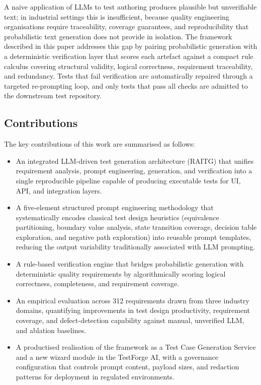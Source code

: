 \documentclass[11pt,letterpaper]{article}
\begin{document}
A naive application of LLMs to test authoring produces plausible but unverifiable text; in industrial settings this is insufficient, because quality engineering organisations require traceability, coverage guarantees, and reproducibility that probabilistic text generation does not provide in isolation. The framework described in this paper addresses this gap by pairing probabilistic generation with a deterministic verification layer that scores each artefact against a compact rule calculus covering structural validity, logical correctness, requirement traceability, and redundancy. Tests that fail verification are automatically repaired through a targeted re-prompting loop, and only tests that pass all checks are admitted to the downstream test repository.

\subsection{Contributions}

The key contributions of this work are summarised as follows:

\begin{itemize}
\item An integrated LLM-driven test generation architecture (RAITG) that unifies requirement analysis, prompt engineering, generation, and verification into a single reproducible pipeline capable of producing executable tests for UI, API, and integration layers.
\item A five-element structured prompt engineering methodology that systematically encodes classical test design heuristics (equivalence partitioning, boundary value analysis, state transition coverage, decision table exploration, and negative path exploration) into reusable prompt templates, reducing the output variability traditionally associated with LLM prompting.
\item A rule-based verification engine that bridges probabilistic generation with deterministic quality requirements by algorithmically scoring logical correctness, completeness, and requirement coverage.
\item An empirical evaluation across 312 requirements drawn from three industry domains, quantifying improvements in test design productivity, requirement coverage, and defect-detection capability against manual, unverified LLM, and ablation baselines.
\item A productised realisation of the framework as a Test Case Generation Service and a new wizard module in the TestForge AI, with a governance configuration that controls prompt content, payload sizes, and redaction patterns for deployment in regulated environments.
\end{itemize}
\end{document}
